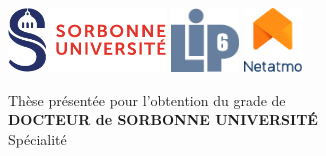 
%

\newcommand{\jurymember}[6]{\hspace{1.5em}{#6} \textbf{{#1} {#2}}, {#3}, {#4} \hfill \textit{{#5}}\\}

\begin{titlepage}
    \begin{flushleft}
        \includegraphics[height=1.7cm]{title_page/assets/sorbonne.pdf}
        \hfill
        \includegraphics[height=1.7cm]{title_page/assets/LogoLIP6.pdf}
        \hfill
        \includegraphics[height=1.7cm]{title_page/assets/netatmo_logo_color.pdf}
    \end{flushleft}
    \vfill
    \begin{center}
        \vspace{1em}
        {\large Thèse présentée pour l'obtention du grade de}\\
        \vspace{1em}
        {\LARGE \textbf{DOCTEUR de SORBONNE UNIVERSITÉ}}\\
        \vspace{2em}
        {\small Spécialité}\\
        \vspace{0.5em}

\end{center}
\end{titlepage}
